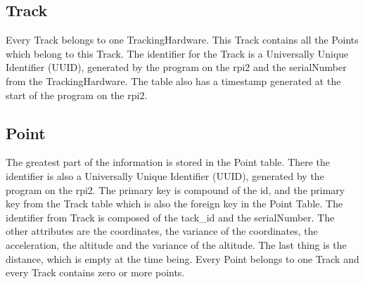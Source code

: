 \subsection{Track}
Every Track belongs to one TrackingHardware. This Track contains all the Points which belong to this Track. The identifier for the Track is a Universally Unique Identifier (UUID), generated by the program on the \gls{rpi2} and the serialNumber from the TrackingHardware. The table also has a timestamp generated at the start of the program on the \gls{rpi2}.
\subsection{Point}
The greatest part of the information is stored in the Point table. There the identifier is also a Universally Unique Identifier (UUID), generated by the program on the \gls{rpi2}. The primary key is compound of the id, and the primary key from the Track table which is also the foreign key in the Point Table. The identifier from Track is composed of the tack\_id and the serialNumber. The other attributes are the coordinates, the variance of the coordinates, the acceleration, the altitude and the variance of the altitude. The last thing is the distance, which is empty at the time being. Every Point belongs to one Track and every Track contains zero or more points.
